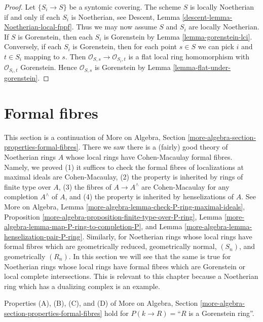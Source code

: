 \begin{proof}
Let $\{S_i \to S\}$ be a syntomic covering. The scheme $S$ is locally
Noetherian if and only if each $S_i$ is Noetherian, see
Descent, Lemma \ref{descent-lemma-Noetherian-local-fppf}.
Thus we may now assume $S$ and $S_i$ are locally Noetherian.
If $S$ is Gorenstein, then
each $S_i$ is Gorenstein by Lemma \ref{lemma-gorenstein-lci}.
Conversely, if each $S_i$ is Gorenstein, then for each point
$s \in S$ we can pick $i$ and $t \in S_i$ mapping to $s$.
Then $\mathcal{O}_{S, s} \to \mathcal{O}_{S_i, t}$
is a flat local ring homomorphism with $\mathcal{O}_{S_i, t}$
Gorenstein. Hence $\mathcal{O}_{S, s}$ is Gorenstein by
Lemma \ref{lemma-flat-under-gorenstein}.
\end{proof}





\section{Formal fibres}
\label{section-formal-fibres}

\noindent
This section is a continuation of
More on Algebra, Section \ref{more-algebra-section-properties-formal-fibres}.
There we saw there is a (fairly) good theory of Noetherian rings $A$
whose local rings have Cohen-Macaulay formal fibres. Namely, we proved
(1) it suffices to check the formal fibres of localizations at
maximal ideals are Cohen-Macaulay,
(2) the property is inherited by rings of finite type over $A$,
(3) the fibres of $A \to A^\wedge$ are Cohen-Macaulay for
any completion $A^\wedge$ of $A$, and
(4) the property is inherited by henselizations of $A$. See
More on Algebra, Lemma \ref{more-algebra-lemma-check-P-ring-maximal-ideals},
Proposition \ref{more-algebra-proposition-finite-type-over-P-ring},
Lemma \ref{more-algebra-lemma-map-P-ring-to-completion-P}, and
Lemma \ref{more-algebra-lemma-henselization-pair-P-ring}.
Similarly, for Noetherian rings whose local rings have formal fibres
which are geometrically reduced, geometrically normal, $(S_n)$, and
geometrically $(R_n)$.
In this section we will see that the same is true for Noetherian rings
whose local rings have formal fibres which are Gorenstein
or local complete intersections.
This is relevant to this chapter because a Noetherian ring which has a
dualizing complex is an example.

\begin{lemma}
\label{lemma-formal-fibres-gorenstein}
Properties (A), (B), (C), and (D) of
More on Algebra, Section \ref{more-algebra-section-properties-formal-fibres}
hold for $P(k \to R) =$``$R$ is a Gorenstein ring''.
\end{lemma}

